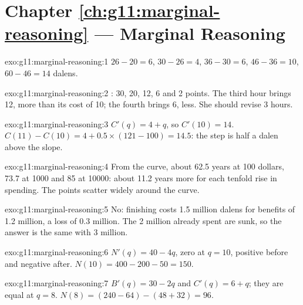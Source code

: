 \section*{Chapter \ref{ch:g11:marginal-reasoning} --- Marginal Reasoning}

\begin{solution}{exo:g11:marginal-reasoning:1}
$26 - 20 = 6$, $30 - 26 = 4$, $36 - 30 = 6$, $46 - 36 = 10$, $60 - 46 = 14$ dalens.
\end{solution}

\begin{solution}{exo:g11:marginal-reasoning:2}
: 30, 20, 12, 6 and 2 points. The third hour brings 12, more than its cost of 10; the fourth brings 6, less. She should revise 3 hours.
\end{solution}

\begin{solution}{exo:g11:marginal-reasoning:3}
$C'(q) = 4 + q$, so $C'(10) = 14$. $C(11) - C(10) = 4 + 0.5 \times (121 - 100) = 14.5$: the step is half a dalen above the slope.
\end{solution}

\begin{solution}{exo:g11:marginal-reasoning:4}
From the curve, about 62.5 years at 100 dollars, 73.7 at 1000 and 85 at 10000: about 11.2 years more for each tenfold rise in spending. The points scatter widely
around the curve.
\end{solution}

\begin{solution}{exo:g11:marginal-reasoning:5}
No: finishing costs 1.5 million dalens for benefits of 1.2 million, a loss of 0.3 million. The 2 million already spent are sunk, so the answer is the same with
3 million.
\end{solution}

\begin{solution}{exo:g11:marginal-reasoning:6}
$N'(q) = 40 - 4q$, zero at $q = 10$, positive before and negative after. $N(10) = 400 - 200 - 50 = 150$.
\end{solution}

\begin{solution}{exo:g11:marginal-reasoning:7}
$B'(q) = 30 - 2q$ and $C'(q) = 6 + q$; they are equal at $q = 8$. $N(8) = (240 - 64) - (48 + 32) = 96$.
\end{solution}

